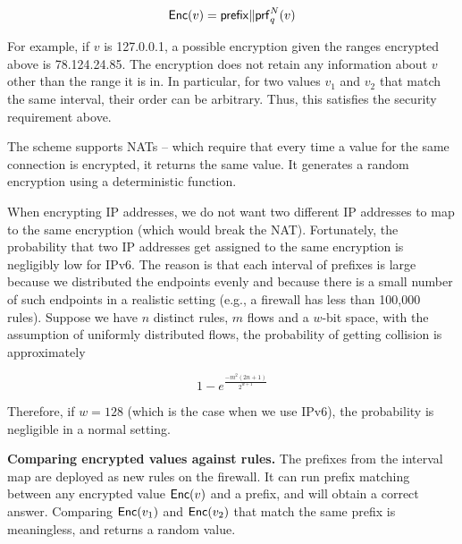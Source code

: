 \begin{equation}
\mathsf{Enc}(v) = \mathsf{prefix} \Vert \mathsf{prf}_q^N(v)
\end{equation}

For example, if $v$ is 127.0.0.1, a possible encryption given the ranges encrypted above is 78.124.24.85. The encryption does not retain any information about $v$ other than the range it is in. In particular, for two values $v_1$ and $v_2$ that match the same interval, their order can be arbitrary. Thus, this satisfies the security requirement above.

The scheme supports NATs -- which require that every time a value for the same connection is encrypted, it returns the same value. It generates a random encryption using a deterministic function. 

When encrypting IP addresses, we do not want two different IP addresses to map to the same encryption (which would break the NAT). Fortunately, the probability that two IP addresses get assigned to the same encryption is negligibly low for IPv6.  The reason is that each interval of prefixes is large because we distributed the endpoints evenly and because there is a small number of such endpoints in a realistic setting (e.g., a firewall has less than 100,000 rules). Suppose we have $n$ distinct rules, $m$ flows and a $w$-bit space, with the assumption of uniformly distributed flows, the probability of getting collision is approximately 

\begin{equation}
1 - e^\frac{-m^2 (2n+1)}{2^{w+1}}
\end{equation}

Therefore, if $w=128$ (which is the case when we use IPv6), the probability is negligible in a normal setting. 


\noindent \textbf{Comparing encrypted values against rules.}
The prefixes from the interval map are deployed as new rules on the firewall. It can run prefix matching between any encrypted value $\mathsf{Enc}(v)$ and a prefix, and will obtain a correct answer. Comparing $\mathsf{Enc}(v_1)$ and $\mathsf{Enc}(v_2)$ that match the same prefix is meaningless, and returns a random value.

